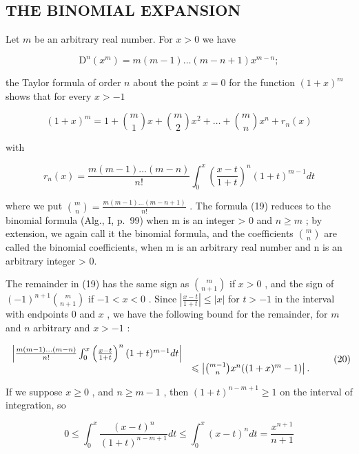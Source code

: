 \subsection{THE BINOMIAL EXPANSION}

Let \(m\) be an arbitrary real number. For \(x > 0\) we have

\[
\mathrm{D} ^ {n} (x ^ {m}) = m (m - 1) \dots (m - n + 1) x ^ {m - n};
\]

the Taylor formula of order \(n\) about the point \(x = 0\) for the function \((1 + x)^m\) shows that for every \(x > -1\)

\[
(1 + x) ^ {m} = 1 + \binom {m} {1} x + \binom {m} {2} x ^ {2} + \dots + \binom {m} {n} x ^ {n} + r _ {n} (x)\tag{19}
\]

with

\[
r _ {n} (x) = \frac {m (m - 1) \dots (m - n)}{n !} \int_ {0} ^ {x} \left(\frac {x - t}{1 + t}\right) ^ {n} (1 + t) ^ {m - 1} d t
\]

where we put \(\binom{m}{n} = \frac{m(m-1)\ldots(m-n+1)}{n!}\) . The formula (19) reduces to the binomial formula (Alg., I, p.~99) when m is an integer \textgreater{} 0 and \(n \geqslant m\) ; by extension, we again call it the binomial formula, and the coefficients \(\binom{m}{n}\) are called the binomial coefficients, when m is an arbitrary real number and n is an arbitrary integer \textgreater{} 0.

The remainder in (19) has the same sign as \(\binom{m}{n+1}\) if \(x > 0\) , and the sign of \((-1)^{n+1}\binom{m}{n+1}\) if \(-1 < x < 0\) . Since \(\left|\frac{x-t}{1+t}\right| \leqslant |x|\) for \(t > -1\) in the interval with endpoints 0 and \(x\) , we have the following bound for the remainder, for \(m\) and \(n\) arbitrary and \(x > -1\) :

\[
\begin{array}{r l} \left| \frac {m (m - 1) \dots (m - n)}{n !} \int_ {0} ^ {x} \left(\frac {x - t}{1 + t}\right) ^ {n} (1 + t) ^ {m - 1} d t \right| & \\ & \leqslant \left| \binom {m - 1} {n} x ^ {n} ((1 + x) ^ {m} - 1) \right|. \end{array}\tag{20}
\]

If we suppose \(x \geqslant 0\) , and \(n \geqslant m - 1\) , then \((1 + t)^{n - m + 1} \geqslant 1\) on the interval of integration, so

\[
0 \leqslant \int_ {0} ^ {x} \frac {(x - t) ^ {n}}{(1 + t) ^ {n - m + 1}} d t \leqslant \int_ {0} ^ {x} (x - t) ^ {n} d t = \frac {x ^ {n + 1}}{n + 1}
\]


